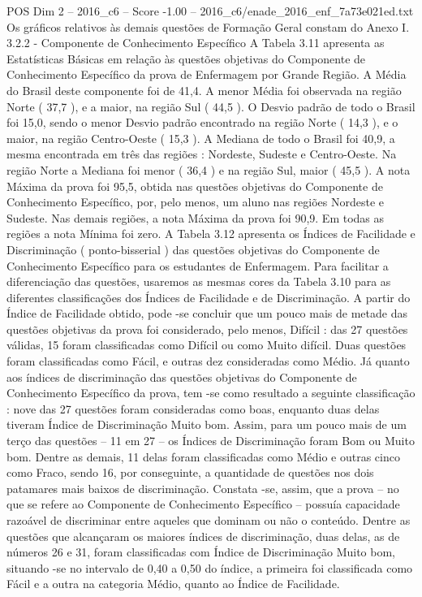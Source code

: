 \begin{textsample}{POS Dim 2 – 2016\_c6 – Score -1.00 – 2016\_c6/enade\_2016\_enf\_7a73e021ed.txt}
Os gráficos relativos às demais questões de Formação Geral constam do Anexo I. 3.2.2 - Componente de Conhecimento Específico A Tabela 3.11 apresenta as Estatísticas Básicas em relação às questões objetivas do Componente de Conhecimento Específico da prova de Enfermagem por Grande Região.
A Média do Brasil deste componente foi de 41,4.
A menor Média foi observada na região Norte ( 37,7 ), e a maior, na região Sul ( 44,5 ).
O Desvio padrão de todo o Brasil foi 15,0, sendo o menor Desvio padrão encontrado na região Norte ( 14,3 ), e o maior, na região Centro-Oeste ( 15,3 ).
A Mediana de todo o Brasil foi 40,9, a mesma encontrada em três das regiões : Nordeste, Sudeste e Centro-Oeste.
Na região Norte a Mediana foi menor ( 36,4 ) e na região Sul, maior ( 45,5 ).
A nota Máxima da prova foi 95,5, obtida nas questões objetivas do Componente de Conhecimento Específico, por, pelo menos, um aluno nas regiões Nordeste e Sudeste.
Nas demais regiões, a nota Máxima da prova foi 90,9.
Em todas as regiões a nota Mínima foi zero.
A Tabela 3.12 apresenta os Índices de Facilidade e Discriminação ( ponto-bisserial ) das questões objetivas do Componente de Conhecimento Específico para os estudantes de Enfermagem.
Para facilitar a diferenciação das questões, usaremos as mesmas cores da Tabela 3.10 para as diferentes classificações dos Índices de Facilidade e de Discriminação.
A partir do Índice de Facilidade obtido, pode -se concluir que um pouco mais de metade das questões objetivas da prova foi considerado, pelo menos, Difícil : das 27 questões válidas, 15 foram classificadas como Difícil ou como Muito difícil.
Duas questões foram classificadas como Fácil, e outras dez consideradas como Médio.
Já quanto aos índices de discriminação das questões objetivas do Componente de Conhecimento Específico da prova, tem -se como resultado a seguinte classificação : nove das 27 questões foram consideradas como boas, enquanto duas delas tiveram Índice de Discriminação Muito bom.
Assim, para um pouco mais de um terço das questões – 11 em 27 – os Índices de Discriminação foram Bom ou Muito bom.
Dentre as demais, 11 delas foram classificadas como Médio e outras cinco como Fraco, sendo 16, por conseguinte, a quantidade de questões nos dois patamares mais baixos de discriminação.
Constata -se, assim, que a prova – no que se refere ao Componente de Conhecimento Específico – possuía capacidade razoável de discriminar entre aqueles que dominam ou não o conteúdo.
Dentre as questões que alcançaram os maiores índices de discriminação, duas delas, as de números 26 e 31, foram classificadas com Índice de Discriminação Muito bom, situando -se no intervalo de 0,40 a 0,50 do índice, a primeira foi classificada como Fácil e a outra na categoria Médio, quanto ao Índice de Facilidade.

\end{textsample}
